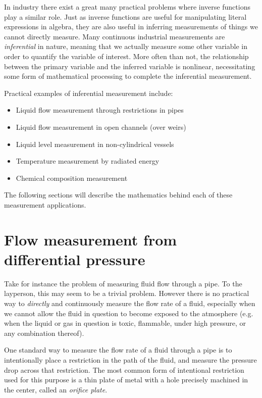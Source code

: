 In industry there exist a great many practical problems where inverse functions play a similar role.  Just as inverse functions are useful for manipulating literal expressions in algebra, they are also useful in inferring measurements of things we cannot directly measure.  Many continuous industrial measurements are \textit{inferential} in nature, meaning that we actually measure some other variable in order to quantify the variable of interest.  More often than not, the relationship between the primary variable and the inferred variable is nonlinear, necessitating some form of mathematical processing to complete the inferential measurement. 

Practical examples of inferential measurement include:

\begin{itemize}
\item Liquid flow measurement through restrictions in pipes
\item Liquid flow measurement in open channels (over weirs)
\item Liquid level measurement in non-cylindrical vessels
\item Temperature measurement by radiated energy
\item Chemical composition measurement
\end{itemize}

The following sections will describe the mathematics behind each of these measurement applications.






\filbreak
\section{Flow measurement from differential pressure}

Take for instance the problem of measuring fluid flow through a pipe.  To the layperson, this may seem to be a trivial problem.  However there is no practical way to \textit{directly} and continuously measure the flow rate of a fluid, especially when we cannot allow the fluid in question to become exposed to the atmosphere (e.g. when the liquid or gas in question is toxic, flammable, under high pressure, or any combination thereof).

One standard way to measure the flow rate of a fluid through a pipe is to intentionally place a restriction in the path of the fluid, and measure the pressure drop across that restriction.  The most common form of intentional restriction used for this purpose is a thin plate of metal with a hole precisely machined in the center, called an \textit{orifice plate}.  

